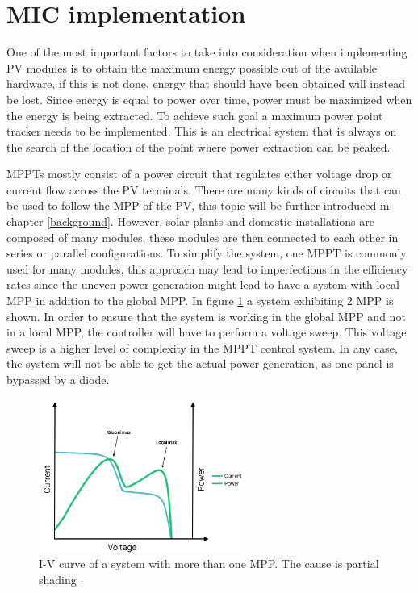 
\section{MIC implementation}
One of the most important factors to take into consideration when implementing PV modules is to obtain the maximum energy possible out of the available hardware, if this is not done, energy that should have been obtained will instead be lost. Since energy is equal to power over time, power must be maximized when the energy is being extracted. To achieve such goal a maximum power point tracker needs to be implemented. This is an electrical system that is always on the search of the location of the point where power extraction can be peaked. 

MPPTs mostly consist of a power circuit that regulates either voltage drop or current flow across the PV terminals. There are many kinds of circuits that can be used to follow the MPP of the PV, this topic will be further introduced in chapter \ref{background}.
However, solar plants and domestic installations are composed of many modules, these modules are then connected to each other in series or parallel configurations. To simplify the system, one MPPT is commonly used for many modules, this approach may lead to imperfections in the efficiency rates since the uneven power generation might lead to have a system with local MPP in addition to the global MPP. In figure \ref{multiple_local_MPP} a system exhibiting 2 MPP is shown. In order to ensure that the system is working in the global MPP and not in a local MPP, the controller will have to perform a voltage sweep. This voltage sweep is a higher level of complexity in the MPPT control system. In any case, the system will not be able to get the actual power generation, as one panel is bypassed by a diode.

\begin{figure}[htbp]
	\begin{center}
		\includegraphics[width=0.6\textwidth]{../Pictures/local_MPP}
		\caption{I-V curve of a system with more than one MPP. The cause is partial shading \cite{local_mpp}.}
		\label{multiple_local_MPP}
	\end{center}	
\end{figure}

